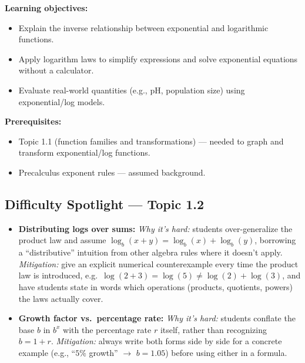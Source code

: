 \documentclass{article}
\begin{document}
\textbf{Learning objectives:}
\begin{itemize}[leftmargin=*]
  \item Explain the inverse relationship between exponential and logarithmic functions.
  \item Apply logarithm laws to simplify expressions and solve exponential equations without a calculator.
  \item Evaluate real-world quantities (e.g., pH, population size) using exponential/log models.
\end{itemize}

\textbf{Prerequisites:}
\begin{itemize}[leftmargin=*]
  \item Topic 1.1 (function families and transformations) --- needed to graph and transform exponential/log functions.
  \item Precalculus exponent rules --- assumed background.
\end{itemize}

\subsection*{Difficulty Spotlight --- Topic 1.2}
\begin{itemize}[leftmargin=*]
  \item \textbf{Distributing logs over sums:} \textit{Why it's hard:} students over-generalize the product law and assume $\log_b(x+y)=\log_b(x)+\log_b(y)$, borrowing a ``distributive'' intuition from other algebra rules where it doesn't apply. \textit{Mitigation:} give an explicit numerical counterexample every time the product law is introduced, e.g.\ $\log(2+3)=\log(5)\neq\log(2)+\log(3)$, and have students state in words which operations (products, quotients, powers) the laws actually cover.
  \item \textbf{Growth factor vs.\ percentage rate:} \textit{Why it's hard:} students conflate the base $b$ in $b^x$ with the percentage rate $r$ itself, rather than recognizing $b=1+r$. \textit{Mitigation:} always write both forms side by side for a concrete example (e.g., ``$5\%$ growth'' $\rightarrow$ $b=1.05$) before using either in a formula.
\end{itemize}
\end{document}
